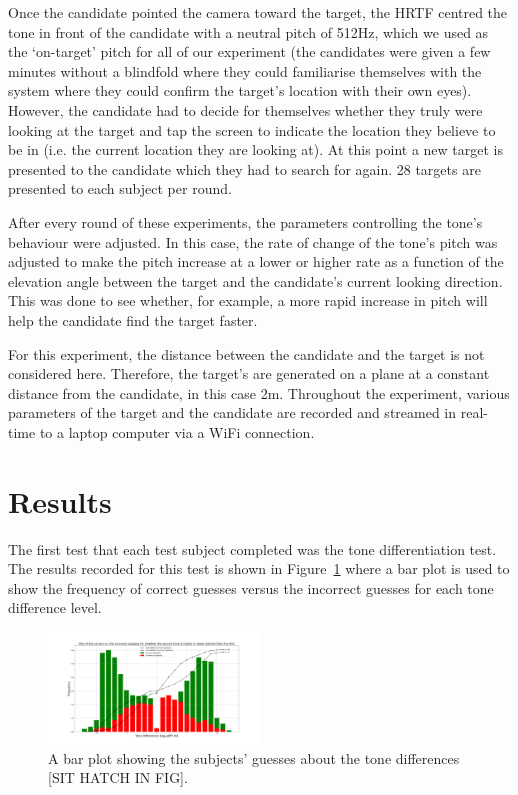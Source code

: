 \documentclass[format=sigconf, review=true, screen=true, anonymous=true]{acmart}
\begin{document}
Once the candidate pointed the camera toward the target, the HRTF centred the tone in front of the candidate with a neutral pitch of 512Hz, which we used as the `on-target' pitch for all of our experiment (the candidates were given a few minutes without a blindfold where they could familiarise themselves with the system where they could confirm the target's location with their own eyes). However, the candidate had to decide for themselves whether they truly were looking at the target and tap the screen to indicate the location they believe to be in (i.e. the current location they are looking at). At this point a new target is presented to the candidate which they had to search for again. 28 targets are presented to each subject per round. 

After every round of these experiments, the parameters controlling the tone's behaviour were adjusted. In this case, the rate of change of the tone's pitch was adjusted to make the pitch increase at a lower or higher rate as a function of the elevation angle between the target and the candidate's current looking direction. This was done to see whether, for example, a more rapid increase in pitch will help the candidate find the target faster. 

For this experiment, the distance between the candidate and the target is not considered here. Therefore, the target's are generated on a plane at a constant distance from the candidate, in this case 2m. Throughout the experiment, various parameters of the target and the candidate are recorded and streamed in real-time to a laptop computer via a WiFi connection.

\section{Results}

The first test that each test subject completed was the tone differentiation test. The results recorded for this test is shown in Figure~\ref{fig:tone-guesses} where a bar plot is used to show the frequency of correct guesses versus the incorrect guesses for each tone difference level. 

\begin{figure}
  \centering
  \includegraphics[width=0.5\textwidth]{figures/tone_guesses.png}
  \caption{A bar plot showing the subjects' guesses about the tone differences [SIT HATCH IN FIG].}
  \label{fig:tone-guesses}
\end{figure}
\end{document}
